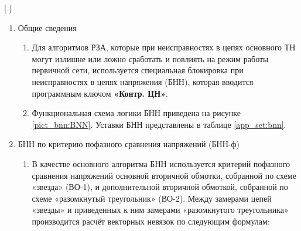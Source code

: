 
[
\def\fileExt{??}
]


\color{black}

\begin{enumerate}

\item Общие сведения
\begin{enumerate}

\item
Для алгоритмов РЗА, которые при неисправностях в цепях основного ТН могут излишне или ложно сработать и повлиять на режим работы первичной сети, используется специальная блокировка при неисправностях в цепях напряжения (БНН), которая вводится программным ключом \textbf{«Контр. ЦН»}.

\item
Функциональная схема логики БНН приведена на рисунке \ref{pict_bnn:BNN}. Уставки БНН представлены в таблице \ref{app_set:bnn}.

\end{enumerate}

\item БНН по критерию пофазного сравнения напряжений (БНН-ф)
\begin{enumerate}

\item
В качестве основного алгоритма БНН используется критерий пофазного сравнения напряжений основной вторичной обмотки, собранной по схеме «звезда» (ВО-1), и дополнительной вторичной обмоткой, собранной по схеме «разомкнутый треугольник» (ВО-2). Между замерами цепей «звезды» и приведенных к ним замерами «разомкнутого треугольника» производится расчёт векторных невязок по следующим формулам:


\end{enumerate}
\end{enumerate}
